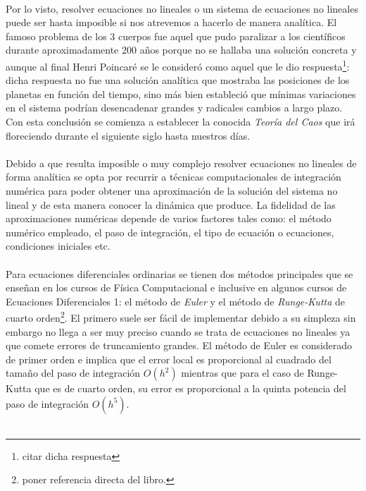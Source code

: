 \\
Por lo visto, resolver ecuaciones no lineales o un sistema de ecuaciones no lineales puede ser hasta imposible si nos atrevemos a hacerlo de manera analítica. El famoso problema de los 3 cuerpos fue aquel que pudo paralizar a los científicos durante aproximadamente 200 años porque no se hallaba una solución concreta y aunque al final Henri Poincaré se le consideró como aquel que le dio respuesta\footnote{citar dicha respuesta}: dicha respuesta no fue una solución analítica que mostraba las posiciones de los planetas en función del tiempo, sino más bien estableció que mínimas variaciones en el sistema podrían desencadenar grandes y radicales cambios a largo plazo. Con esta conclusión se comienza a establecer la conocida \textit{Teoría del Caos} que irá floreciendo durante el siguiente siglo hasta nuestros días.\\
\\
Debido a que resulta imposible o muy complejo resolver ecuaciones no lineales de forma analítica se opta por recurrir a técnicas computacionales de integración numérica para poder obtener una aproximación de la solución del sistema no lineal y de esta manera conocer la dinámica que produce. La fidelidad de las aproximaciones numéricas depende de varios factores tales como: el método numérico empleado, el paso de integración, el tipo de ecuación o ecuaciones, condiciones iniciales etc. \\
\\
Para ecuaciones diferenciales ordinarias se tienen dos métodos principales que se enseñan en los cursos de Física Computacional e inclusive en algunos cursos de Ecuaciones Diferenciales 1: el método de \textit{Euler} y el método de \textit{Runge-Kutta} de cuarto orden\footnote{poner referencia directa del libro.}. El primero suele ser fácil de implementar debido a su simpleza sin embargo no llega a ser muy preciso cuando se trata de ecuaciones no lineales ya que comete errores de truncamiento grandes. El método de Euler es considerado de primer orden e implica que el error local es proporcional al cuadrado del tamaño del paso de integración $O(h^2)$ mientras que para el caso de Runge-Kutta que es de cuarto orden, su error es proporcional a la quinta potencia del paso de integración $O(h^5)$.\\
\\
